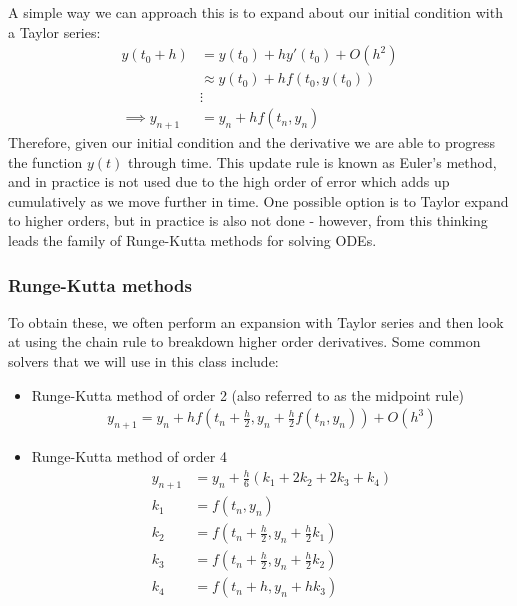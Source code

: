 \documentclass[11pt,a4paper]{report}
\begin{document}
			A simple way we can approach this is to expand about our initial condition with a Taylor series:
			\begin{align}
				y(t_0 + h) &= y(t_0) + hy'(t_0) + O(h^2) \\
				&\approx y(t_0) + h f(t_0, y(t_0)) \\
				&\vdots \\
				\implies y_{n+1} &= y_n + hf(t_n, y_n)
			\end{align}
			Therefore, given our initial condition and the derivative we are able to progress the function $y(t)$ through time. This update rule is known as Euler's method, and in practice is not used due to the high order of error which adds up cumulatively as we move further in time. One possible option is to Taylor expand to higher orders, but in practice is also not done - however, from this thinking leads the family of Runge-Kutta methods for solving ODEs.
			
			\subsubsection{Runge-Kutta methods}
			To obtain these, we often perform an expansion with Taylor series and then look at using the chain rule to breakdown higher order derivatives. Some common solvers that we will use in this class include:
			\begin{itemize}
				\item Runge-Kutta method of order 2 (also referred to as the midpoint rule)
				\begin{align}
					y_{n+1} = y_n + h f\left(t_n + \frac{h}{2}, y_n + \frac{h}{2} f(t_n,y_n)\right) + O(h^3)
				\end{align}
				\item Runge-Kutta method of order 4
				\begin{align}
					y_{n+1} &= y_n + \frac{h}{6} \left( k_1 + 2k_2 + 2k_3 + k_4 \right) \\
					k_1 &= f(t_n,y_n)\nonumber \\
					k_2 &= f\left(t_n + \frac{h}{2}, y_n + \frac{h}{2}k_1\right) \nonumber\\
					k_3 &= f\left(t_n + \frac{h}{2}, y_n + \frac{h}{2}k_2\right) \nonumber\\
					k_4 &= f\left(t_n + h, y_n + hk_3\right) \nonumber
				\end{align}
			\end{itemize}
\end{document}

